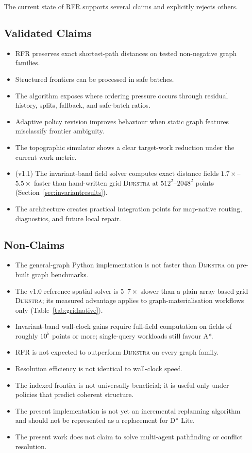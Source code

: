 \documentclass[11pt]{article}
\newcommand{\RFR}{\textsc{RFR}}
\newcommand{\Dijkstra}{\textsc{Dijkstra}}
\begin{document}
The current state of \RFR{} supports several claims and explicitly rejects others.

\subsection{Validated Claims}

\begin{itemize}
  \item \RFR{} preserves exact shortest-path distances on tested non-negative graph families.
  \item Structured frontiers can be processed in safe batches.
  \item The algorithm exposes where ordering pressure occurs through residual history, splits, fallback, and safe-batch ratios.
  \item Adaptive policy revision improves behaviour when static graph features misclassify frontier ambiguity.
  \item The topographic simulator shows a clear target-work reduction under the current work metric.
  \item (v1.1) The invariant-band field solver computes exact distance fields $1.7\times$--$5.5\times$ faster than hand-written grid \Dijkstra{} at $512^2$--$2048^2$ points (Section~\ref{sec:invariantresults}).
  \item The architecture creates practical integration points for map-native routing, diagnostics, and future local repair.
\end{itemize}

\subsection{Non-Claims}

\begin{itemize}
  \item The general-graph Python implementation is not faster than \Dijkstra{} on pre-built graph benchmarks.
  \item The v1.0 reference spatial solver is $5$--$7\times$ slower than a plain array-based grid \Dijkstra{}; its measured advantage applies to graph-materialisation workflows only (Table~\ref{tab:gridnative}).
  \item Invariant-band wall-clock gains require full-field computation on fields of roughly $10^5$ points or more; single-query workloads still favour A*.
  \item \RFR{} is not expected to outperform \Dijkstra{} on every graph family.
  \item Resolution efficiency is not identical to wall-clock speed.
  \item The indexed frontier is not universally beneficial; it is useful only under policies that predict coherent structure.
  \item The present implementation is not yet an incremental replanning algorithm and should not be represented as a replacement for D* Lite.
  \item The present work does not claim to solve multi-agent pathfinding or conflict resolution.
\end{itemize}
\end{document}
